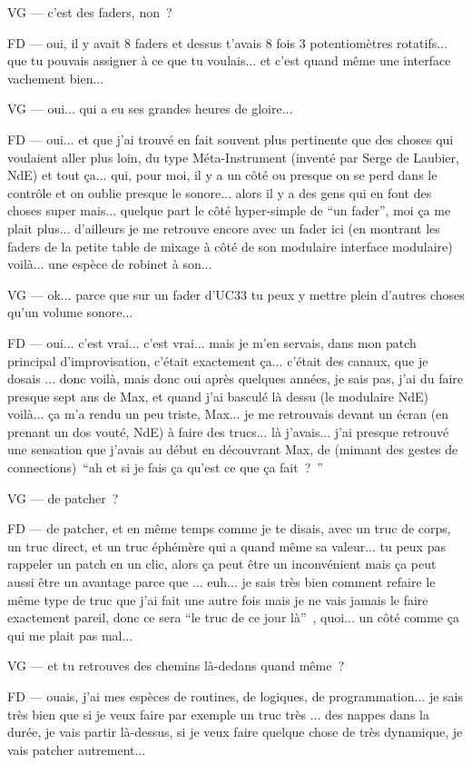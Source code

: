 VG — c'est des faders, non ? 

FD — oui, il y avait 8 faders et dessus t'avais 8 fois 3 potentiomètres rotatifs... que tu pouvais assigner à ce que tu voulais... et c'est quand même une interface vachement bien... 

VG — oui... qui a eu ses grandes heures de gloire... 

FD — oui... et que j'ai trouvé en fait souvent plus pertinente que des choses qui voulaient aller plus loin, du type Méta-Instrument (inventé par Serge de Laubier, NdE) et tout ça... qui, pour moi, il y a un côté ou presque on se perd dans le contrôle et on oublie presque le sonore... alors il y a des gens qui en font des choses super mais... quelque part le côté hyper-simple de ``un fader'', moi ça me plait plus... d'ailleurs je me retrouve encore avec un fader ici (en montrant les faders de la petite table de mixage à côté de son modulaire interface modulaire) voilà... une espèce de robinet à son... 

VG — ok... parce que sur un fader d'UC33 tu peux y mettre plein d'autres choses qu'un volume sonore... 

FD — oui... c'est vrai... c'est vrai... mais je m'en servais, dans mon patch principal d'improvisation, c'était exactement ça... c'était des canaux, que je dosais ... donc voilà, mais donc oui après quelques années, je sais pas, j'ai du faire presque sept ans de Max, et quand j'ai basculé là dessu (le modulaire NdE) voilà... ça m'a rendu un peu triste, Max... je me retrouvais devant un écran (en prenant un dos vouté, NdE) à faire des trucs... là j'avais... j'ai presque retrouvé une sensation que j'avais au début en découvrant Max, de (mimant des gestes de connections) ``ah et si je fais ça qu'est ce que ça fait ? '' 

VG — de patcher ? 

FD — de patcher, et en même temps comme je te disais, avec un truc de corps, un truc direct, et un truc éphémère qui a quand même sa valeur... tu peux pas rappeler un patch en un clic, alors ça peut être un inconvénient mais ça peut aussi être un avantage parce que ... euh... je sais très bien comment refaire le même type de truc que j'ai fait une autre fois mais je ne vais jamais le faire exactement pareil, donc ce sera ``le truc de ce jour là'' , quoi... un côté comme ça qui me plait pas mal... 

VG — et tu retrouves des chemins là-dedans quand même ? 

FD — ouais, j'ai mes espèces de routines, de logiques, de programmation... je sais très bien que si je veux faire par exemple un truc très ... des nappes dans la durée, je vais partir là-dessus, si je veux faire quelque chose de très dynamique, je vais patcher autrement... 

